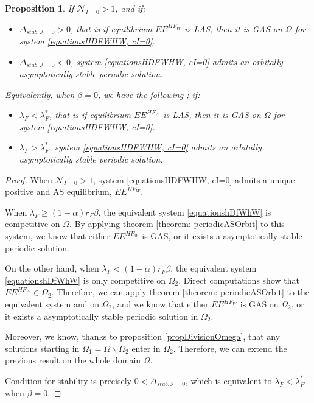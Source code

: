 \documentclass{article}
\newcommand{\lfw}{\lambda_{F}}
\newcommand{\lfw}{\lambda_{F}}
\newcommand{\cI}{\mathcal{I}}
\newtheorem{prop}{Proposition}
\begin{document}
\begin{prop}\label{LimitCycle, cI=0}
If $\mathcal{N}_{I =0} > 1$, and if:
\begin{itemize}
\item $\Delta_{stab, \cI =0} > 0$, that is if equilibrium $EE^{HF_W}$ is LAS, then it is GAS on $\Omega$ for system \eqref{equationsHDFWHW, cI=0}.
\item $\Delta_{stab, \cI =0} < 0$, system \eqref{equationsHDFWHW, cI=0} admits an orbitally asymptotically stable periodic solution.
\end{itemize}

Equivalently, when $\beta = 0$, we have the following ; if:
\begin{itemize}
\item $\lfw <  \lfw^*$, that is if equilibrium $EE^{HF_W}$ is LAS, then it is GAS on $\Omega$ for system \eqref{equationsHDFWHW, cI=0}.
\item $\lfw  > \lfw^*$, system \eqref{equationsHDFWHW, cI=0} admits an orbitally asymptotically stable periodic solution.
\end{itemize}
\end{prop}

\begin{proof}
When $\mathcal{N}_{I =0} > 1$, system \eqref{equationsHDFWHW, cI=0} admits a unique positive and AS equilibrium, $EE^{HF_W}$.  

When $\lfw \geq (1-\alpha)r_F \beta$, the equivalent system \eqref{equationshDfWhW} is competitive on $\Omega$. By applying theorem \ref{theorem: periodicASOrbit} to this system, we know that either $EE^{HF_W}$ is GAS, or it exists a asymptotically stable periodic solution. 
\medskip

On the other hand, when $\lfw < (1-\alpha)r_F \beta$, the equivalent system \eqref{equationshDfWhW} is only competitive on $\Omega_2$. Direct computations show that $EE^{HF_W} \in \Omega_2$. Therefore, we can apply theorem \ref{theorem: periodicASOrbit} to the equivalent system and on $\Omega_2$, and we know that either $EE^{HF_W}$ is GAS on $\Omega_2$, or it exists a asymptotically stable periodic solution in $\Omega_2$. 

Moreover, we know, thanks to proposition \eqref{propDivisionOmega}, that any solutions starting in $\Omega_1 = \Omega \backslash \Omega_2$ enter in $\Omega_2$. Therefore, we can extend the previous result on the whole domain $\Omega$.

Condition for stability is precisely $0 < \Delta_{stab, \cI =0}$, which is equivalent to $\lfw < \lfw^*$ when $\beta = 0$.
\end{proof} 
\end{document}
